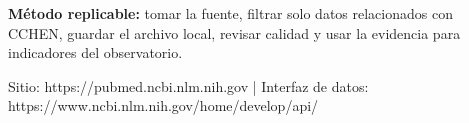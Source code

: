 \documentclass[9pt,a4paper]{extarticle}
\begin{document}
\vspace{0.06cm}
\begin{tcolorbox}[enhanced,colback=white,colframe=cchenpurple!55,boxrule=0.45pt,arc=2pt,left=6pt,right=6pt,top=5pt,bottom=5pt]
{\bfseries\color{cchenpurple}Método replicable:} tomar la fuente, filtrar solo datos relacionados con CCHEN, guardar el archivo local, revisar calidad y usar la evidencia para indicadores del observatorio.
\end{tcolorbox}

\vspace{0.02cm}
{\scriptsize\color{mutedgray}Sitio: https://pubmed.ncbi.nlm.nih.gov \quad | \quad Interfaz de datos: https://www.ncbi.nlm.nih.gov/home/develop/api/}
\end{document}
